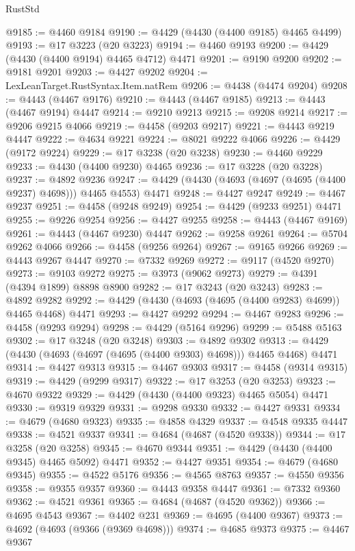 \begin{lexlean}{RustStd}
\begin{coremodule}
@9185 := @4460 @9184
@9190 := @4429 (@4430 (@4400 @9185) @4465 @4499)
@9193 := @17 @3223 (@20 @3223)
@9194 := @4460 @9193
@9200 := @4429 (@4430 (@4400 @9194) @4465 @4712) @4471
@9201 := @9190 @9200
@9202 := @9181 @9201
@9203 := @4427 @9202
@9204 := LexLeanTarget.RustSyntax.Item.natRem
@9206 := @4438 (@4474 @9204)
@9208 := @4443 (@4467 @9176)
@9210 := @4443 (@4467 @9185)
@9213 := @4443 (@4467 @9194) @4447
@9214 := @9210 @9213
@9215 := @9208 @9214
@9217 := @9206 @9215 @4066
@9219 := @4458 (@9203 @9217)
@9221 := @4443 @9219 @4447
@9222 := @4634 @9221
@9224 := @8021 @9222 @4066
@9226 := @4429 (@9172 @9224)
@9229 := @17 @3238 (@20 @3238)
@9230 := @4460 @9229
@9233 := @4430 (@4400 @9230) @4465
@9236 := @17 @3228 (@20 @3228)
@9237 := @4892 @9236
@9247 := @4429 (@4430 (@4693 (@4697 (@4695 (@4400 @9237) @4698))) @4465 @4553) @4471
@9248 := @4427 @9247
@9249 := @4467 @9237
@9251 := @4458 (@9248 @9249)
@9254 := @4429 (@9233 @9251) @4471
@9255 := @9226 @9254
@9256 := @4427 @9255
@9258 := @4443 (@4467 @9169)
@9261 := @4443 (@4467 @9230) @4447
@9262 := @9258 @9261
@9264 := @5704 @9262 @4066
@9266 := @4458 (@9256 @9264)
@9267 := @9165 @9266
@9269 := @4443 @9267 @4447
@9270 := @7332 @9269
@9272 := @9117 (@4520 @9270)
@9273 := @9103 @9272
@9275 := @3973 (@9062 @9273)
@9279 := @4391 (@4394 @1899) @8898 @8900
@9282 := @17 @3243 (@20 @3243)
@9283 := @4892 @9282
@9292 := @4429 (@4430 (@4693 (@4695 (@4400 @9283) @4699)) @4465 @4468) @4471
@9293 := @4427 @9292
@9294 := @4467 @9283
@9296 := @4458 (@9293 @9294)
@9298 := @4429 (@5164 @9296)
@9299 := @5488 @5163
@9302 := @17 @3248 (@20 @3248)
@9303 := @4892 @9302
@9313 := @4429 (@4430 (@4693 (@4697 (@4695 (@4400 @9303) @4698))) @4465 @4468) @4471
@9314 := @4427 @9313
@9315 := @4467 @9303
@9317 := @4458 (@9314 @9315)
@9319 := @4429 (@9299 @9317)
@9322 := @17 @3253 (@20 @3253)
@9323 := @4670 @9322
@9329 := @4429 (@4430 (@4400 @9323) @4465 @5054) @4471
@9330 := @9319 @9329
@9331 := @9298 @9330
@9332 := @4427 @9331
@9334 := @4679 (@4680 @9323)
@9335 := @4858 @4329
@9337 := @4548 @9335 @4447
@9338 := @4521 @9337
@9341 := @4684 (@4687 (@4520 @9338))
@9344 := @17 @3258 (@20 @3258)
@9345 := @4670 @9344
@9351 := @4429 (@4430 (@4400 @9345) @4465 @5092) @4471
@9352 := @4427 @9351
@9354 := @4679 (@4680 @9345)
@9355 := @4522 @5176
@9356 := @4565 @8763
@9357 := @4550 @9356
@9358 := @9355 @9357
@9360 := @4443 @9358 @4447
@9361 := @7332 @9360
@9362 := @4521 @9361
@9365 := @4684 (@4687 (@4520 @9362))
@9366 := @4695 @4543
@9367 := @4402 @231
@9369 := @4695 (@4400 @9367)
@9373 := @4692 (@4693 (@9366 (@9369 @4698)))
@9374 := @4685 @9373
@9375 := @4467 @9367

\end{coremodule}
\end{lexlean}
